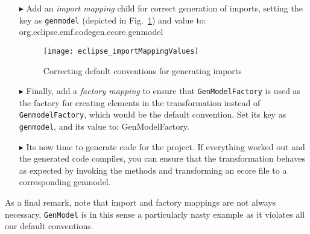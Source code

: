 \begin{enumerate}
\item[$\blacktriangleright$] Add an \emph{import mapping} child for correct generation of imports, setting the key as \texttt{genmodel} (depicted in Fig.~\ref{eclipse:impMapValues}) and value to: \\
{\small \ttfamily \hspace*{0.5cm} org.\-eclipse.\-emf.\-codegen.\-ecore.\-genmodel}

\vspace{0.5cm}

\begin{figure}[htbp]
\begin{centering}
\texttt{[image: eclipse\_importMappingValues]}
  \caption{Correcting default conventions for generating imports}  
  \label{eclipse:impMapValues}
\end{centering}
\end{figure} 

\item [$\blacktriangleright$] Finally, add a \emph{factory mapping} to ensure that \texttt{GenModelFactory} is used as the factory for creating elements in the
transformation instead of \texttt{Genmodel\-Factory}, which would be the default convention. Set its key as \texttt{genmodel}, and its value to:
{\small \ttfamily GenModelFactory}.

\item [$\blacktriangleright$] Its now time to generate code for the project.
If everything worked out and the generated code compiles, you can ensure that the transformation behaves as expected by invoking the methods and transforming an ecore file to a corresponding genmodel.

\end{enumerate}


As a final remark, note that import and factory mappings are not always necessary, \texttt{GenModel} is in this sense a particularly nasty example as it violates all our default conventions.
 